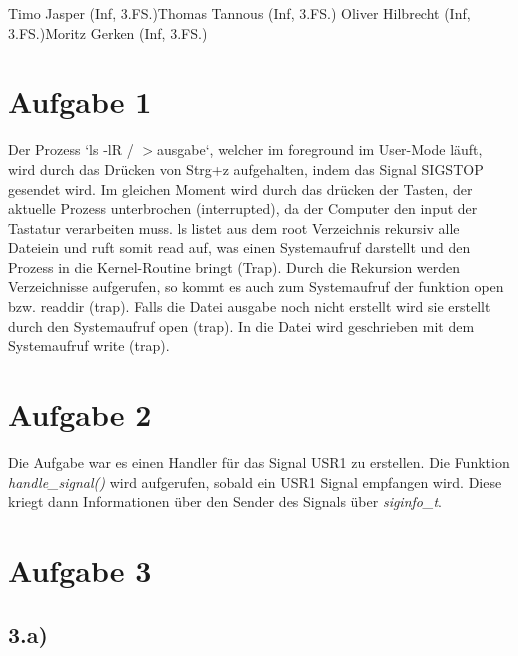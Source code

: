 \documentclass{ti2}
\begin{document}
\lstset{linewidth=\linewidth,breaklines=true}
%
                {Timo Jasper (Inf, 3.FS.)}{Thomas Tannous (Inf, 3.FS.)}%
                {Oliver Hilbrecht (Inf, 3.FS.)}{Moritz Gerken (Inf, 3.FS.)}%

\section*{Aufgabe 1}

Der Prozess `ls -lR / $>$ausgabe`, welcher im foreground im User-Mode läuft, wird durch das Drücken von Strg+z
aufgehalten, indem das Signal SIGSTOP gesendet wird. Im gleichen Moment wird durch das drücken der Tasten, der aktuelle Prozess unterbrochen (interrupted), da der Computer
den input der Tastatur verarbeiten muss. 
ls listet aus dem root Verzeichnis rekursiv alle Dateiein und ruft somit read auf, was einen Systemaufruf darstellt und den Prozess in die Kernel-Routine bringt (Trap).
Durch die Rekursion werden Verzeichnisse aufgerufen, so kommt es auch zum Systemaufruf der funktion open bzw. readdir (trap). 
Falls die Datei ausgabe noch nicht erstellt wird sie erstellt durch den Systemaufruf open (trap). In die Datei wird geschrieben mit dem Systemaufruf write (trap).



\section*{Aufgabe 2}

Die Aufgabe war es einen Handler für das Signal USR1 zu erstellen. 
Die Funktion \emph{handle\_signal()} wird aufgerufen, sobald
ein USR1 Signal empfangen wird. Diese kriegt dann Informationen über den Sender des 
Signals über \emph{siginfo\_t}.





\section*{Aufgabe 3}

\subsection*{3.a)}
\end{document}
